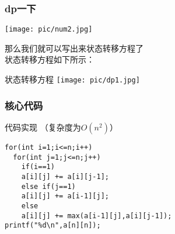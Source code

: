 \documentclass{beamer}
\begin{document}
\begin{frame}[fragile]
\frametitle{dp一下 }
\begin{minipage}[b]{0.30\linewidth}
	\texttt{[image: pic/num2.jpg]}
\end{minipage}
\hfill
\begin{minipage}[b]{0.55\linewidth}
	那么我们就可以写出来状态转移方程了 \\
	状态转移方程如下所示：\\
\end{minipage}
\begin{block}{状态转移方程}
\texttt{[image: pic/dp1.jpg]}
\end{block}
\end{frame}



\begin{frame}[fragile]
\frametitle{核心代码}
\begin{block}{代码实现  （复杂度为$O(n^2)$）}
\begin{lstlisting}
for(int i=1;i<=n;i++)
  for(int j=1;j<=n;j++)
    if(i==1)    
	a[i][j] += a[i][j-1];
    else if(j==1)
	a[i][j] += a[i-1][j];
    else
	a[i][j] += max(a[i-1][j],a[i][j-1]);
printf("%d\n",a[n][n]);
\end{lstlisting}
\end{block}
\end{frame}
\end{document}
